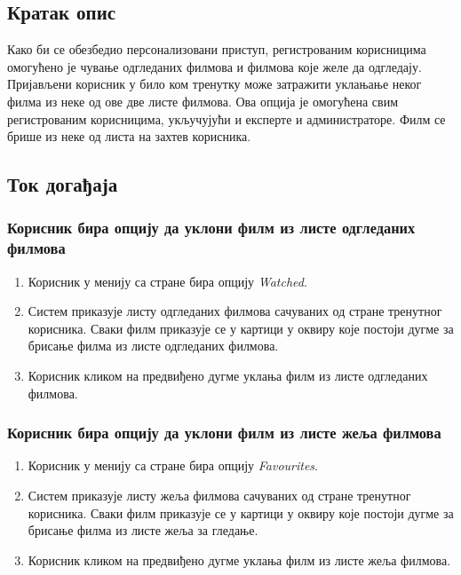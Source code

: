 \subsection{Кратак опис}

Како би се обезбедио персонализовани приступ, регистрованим корисницима омогућено је чување одгледаних
филмова и филмова које желе да одгледају. Пријављени корисник у било ком тренутку може затражити уклањање неког 
филма из неке од ове две листе филмова. Ова опција је омогућена свим регистрованим корисницима, укључујући и експерте 
и администраторе. Филм се брише из неке од листа на захтев корисника.

\subsection{Ток догађаја}

\subsubsection{Корисник бира опцију да уклони филм из листе одгледаних филмова}

\begin{enumerate}
    \item Корисник у менију са стране бира опцију \textit{Watched}.
    \item Систем приказује листу одгледаних филмова сачуваних од стране тренутног корисника. Сваки филм 
    приказује се у картици у оквиру које постоји дугме за брисање филма из листе одгледаних филмова.
    \item Корисник кликом на предвиђено дугме уклања филм из листе одгледаних филмова.
\end{enumerate}

\subsubsection{Корисник бира опцију да уклони филм из листе жеља филмова}

\begin{enumerate}
    \item Корисник у менију са стране бира опцију \textit{Favourites}.
    \item Систем приказује листу жеља филмова сачуваних од стране тренутног корисника. Сваки филм 
    приказује се у картици у оквиру које постоји дугме за брисање филма из листе жеља за гледање.
    \item Корисник кликом на предвиђено дугме уклања филм из листе жеља филмова.
\end{enumerate}

